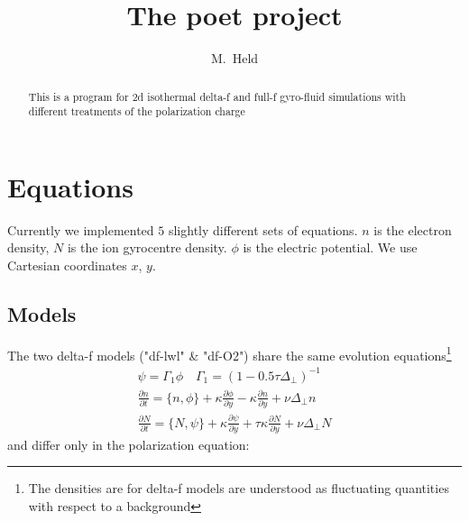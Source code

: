 





\title{The poet project}
\author{M.~Held}
\maketitle

\begin{abstract}
  This is a program for 2d isothermal delta-f and full-f gyro-fluid simulations with different treatments of the polarization charge
\end{abstract}

\section{Equations}
Currently we implemented $5$ slightly different sets of equations. $n$ is the electron density, $N$ is the ion gyrocentre density. $\phi$ is the electric potential. We
use Cartesian coordinates $x$, $y$.
\subsection{Models}


The two delta-f models ("df-lwl" \& "df-O2") share the same evolution equations\footnote{The densities are for delta-f models are understood as fluctuating quantities with respect to a background} 
\begin{subequations}
\begin{align}
\psi = \Gamma_1 \phi \quad \Gamma_1 = ( 1- 0.5\tau\Delta_{\perp})^{-1} \\
 \frac{\partial n}{\partial t}     = 
    \{ n, \phi\} 
  + \kappa \frac{\partial \phi}{\partial y} 
  -\kappa \frac{\partial n}{\partial y}
  + \nu \Delta_{\perp} n  \\
  \frac{\partial N}{\partial t} =
  \{ N, \psi\} 
  + \kappa \frac{\partial \psi}{\partial y} 
  + \tau \kappa\frac{\partial N}{\partial y} +\nu\Delta_{\perp}N
\end{align}
\end{subequations}
and differ only in the polarization equation:\\

